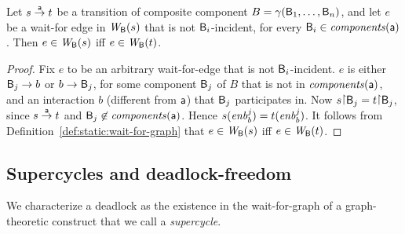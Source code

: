 \begin{proposition} \label{prop:wait-for-edge-preservation}
Let $s \stackrel{\mathsf{a}}{\rightarrow} t$ be a transition of composite component $B =
\gamma(\mathsf{B}_1,\dots,\mathsf{B}_n)$, and let $e$ be a wait-for edge in $\mathit{W}_{\mathsf{B}}({s})$
that is not $\mathsf{B}_i$-incident, for every $\mathsf{B}_i \in \mathit{components}(\mathsf{a})$. Then $e \in
\mathit{W}_{\mathsf{B}}({s})$ iff $e \in \mathit{W}_{\mathsf{B}}({t})$. 
\end{proposition}
%
%
\begin{proof}
Fix $e$ to be an arbitrary wait-for-edge that is not
$\mathsf{B}_i$-incident. $e$ is either $\mathsf{B}_j \rightarrow b$ or $b \rightarrow \mathsf{B}_j$, for some
component $\mathsf{B}_j$ of $B$ that is not in $\mathit{components}(\mathsf{a})$, and an interaction $b$
(different from $\mathsf{a}$) that $\mathsf{B}_j$ participates in.
%
Now $s \pj \B_j = t \pj \B_j$, since $s \stackrel{\mathsf{a}}{\rightarrow} t$ and $\mathsf{B}_j \not\in \mathit{components}(\mathsf{a})$. Hence $s(\mathit{enb}_{b}^{j}) =
t(\mathit{enb}_{b}^{j})$. It follows from Definition~\ref{def:static:wait-for-graph} that 
$e \in \mathit{W}_{\mathsf{B}}({s})$ iff $e \in \mathit{W}_{\mathsf{B}}({t})$.
\end{proof}



\subsection{Supercycles and deadlock-freedom}

We characterize a deadlock as the existence in the wait-for-graph of a
graph-theoretic construct that we call a {\em supercycle}.

